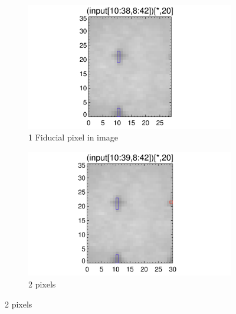 \documentclass[10pt]{article}
\begin{document}
\begin{figure}[!h]
    \centering 
    \begin{subfigure}[b]{.45\linewidth}
        \centering
        \includegraphics[width=1.3\textwidth]{../plots_tables_images/fidcheck_newdegree0.png}
        \caption{1 Fiducial pixel in image}
    \end{subfigure}
    \begin{subfigure}[b]{.45\linewidth}
        \centering
        \includegraphics[width=1.3\textwidth]{../plots_tables_images/fidcheck_newdegree1.png}
        \caption{2 pixels}
    \end{subfigure}
   

\end{figure}
\end{document}
